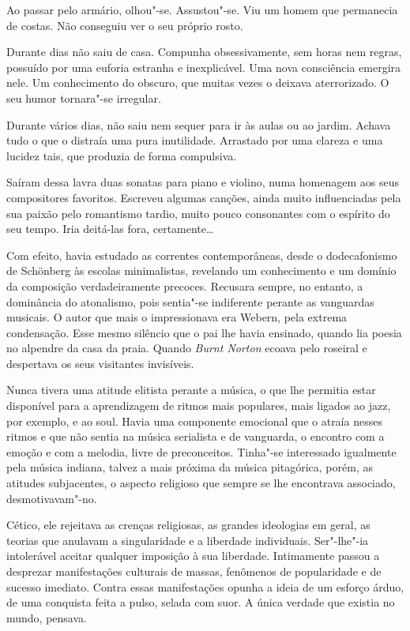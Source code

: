 Ao passar pelo armário, olhou"-se. Assustou"-se. Viu um homem que
permanecia de costas. Não conseguiu ver o seu próprio rosto.

Durante dias não saiu de casa. Compunha obsessivamente, sem horas nem
regras, possuído por uma euforia estranha e inexplicável. Uma nova
consciência emergira nele. Um conhecimento do obscuro, que muitas vezes
o deixava aterrorizado. O seu humor tornara"-se irregular.

Durante vários dias, não saiu nem sequer para ir às aulas ou ao jardim.
Achava tudo o que o distraía uma pura inutilidade. Arrastado por uma
clareza e uma lucidez tais, que produzia de forma compulsiva.

Saíram dessa lavra duas sonatas para piano e violino, numa homenagem aos
seus compositores favoritos. Escreveu algumas canções, ainda muito
influenciadas pela sua paixão pelo romantismo tardio, muito pouco
consonantes com o espírito do seu tempo. Iria deitá-las fora,
certamente\ldots{}

Com efeito, havia estudado as correntes contemporâneas, desde o
dodecafonismo de Schönberg às escolas minimalistas, revelando um
conhecimento e um domínio da composição verdadeiramente precoces.
Recusara sempre, no entanto, a dominância do atonalismo, pois sentia"-se
indiferente perante as vanguardas musicais. O autor que mais o
impressionava era Webern, pela extrema condensação. Esse mesmo silêncio
que o pai lhe havia ensinado, quando lia poesia no alpendre da casa da
praia. Quando \emph{Burnt Norton }ecoava pelo roseiral e despertava os
seus visitantes invisíveis.

Nunca tivera uma atitude elitista perante a música, o que lhe permitia
estar disponível para a aprendizagem de ritmos mais populares, mais
ligados ao jazz, por exemplo, e ao soul. Havia uma componente emocional
que o atraía nesses ritmos e que não sentia na música serialista e de
vanguarda, o encontro com a emoção e com a melodia, livre de
preconceitos. Tinha"-se interessado igualmente pela música indiana,
talvez a mais próxima da música pitagórica, porém, as atitudes
subjacentes, o aspecto religioso que sempre se lhe encontrava associado,
desmotivavam"-no.

Cético, ele rejeitava as crenças religiosas, as grandes ideologias em
geral, as teorias que anulavam a singularidade e a liberdade
individuais. Ser"-lhe"-ia intolerável aceitar qualquer imposição à sua
liberdade. Intimamente passou a desprezar manifestações culturais de
massas, fenômenos de popularidade e de sucesso imediato. Contra essas
manifestações opunha a ideia de um esforço árduo, de uma conquista feita
a pulso, selada com suor. A única verdade que existia no mundo, pensava.

